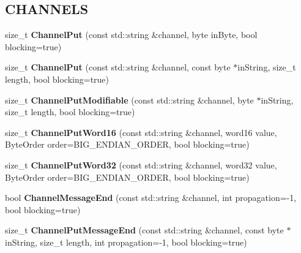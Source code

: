 \subsection*{CHANNELS}
\label{_amgrp1fdf75ac0fba97b7f66ad06fdd4493fd}
 \begin{DoxyCompactItemize}
\item 
\hypertarget{class_buffered_transformation_a97a60b54fafdb3df59e1457ef629fc5f}{
size\_\-t {\bfseries ChannelPut} (const std::string \&channel, byte inByte, bool blocking=true)}
\label{class_buffered_transformation_a97a60b54fafdb3df59e1457ef629fc5f}

\item 
\hypertarget{class_buffered_transformation_a5b7fcb31b4cb09d38242354fcbc4b45c}{
size\_\-t {\bfseries ChannelPut} (const std::string \&channel, const byte $\ast$inString, size\_\-t length, bool blocking=true)}
\label{class_buffered_transformation_a5b7fcb31b4cb09d38242354fcbc4b45c}

\item 
\hypertarget{class_buffered_transformation_a3dc27692b14108ed057beb4db67fed2f}{
size\_\-t {\bfseries ChannelPutModifiable} (const std::string \&channel, byte $\ast$inString, size\_\-t length, bool blocking=true)}
\label{class_buffered_transformation_a3dc27692b14108ed057beb4db67fed2f}

\item 
\hypertarget{class_buffered_transformation_aa1bca66c16e0e52793059b41353964bd}{
size\_\-t {\bfseries ChannelPutWord16} (const std::string \&channel, word16 value, ByteOrder order=BIG\_\-ENDIAN\_\-ORDER, bool blocking=true)}
\label{class_buffered_transformation_aa1bca66c16e0e52793059b41353964bd}

\item 
\hypertarget{class_buffered_transformation_acb06216012d6c40609db092952afcf3f}{
size\_\-t {\bfseries ChannelPutWord32} (const std::string \&channel, word32 value, ByteOrder order=BIG\_\-ENDIAN\_\-ORDER, bool blocking=true)}
\label{class_buffered_transformation_acb06216012d6c40609db092952afcf3f}

\item 
\hypertarget{class_buffered_transformation_ae0b37b299c5835083e58b205f9cc25cc}{
bool {\bfseries ChannelMessageEnd} (const std::string \&channel, int propagation=-\/1, bool blocking=true)}
\label{class_buffered_transformation_ae0b37b299c5835083e58b205f9cc25cc}

\item 
\hypertarget{class_buffered_transformation_ad3e9efe4c59093c330d287140fcfbdd9}{
size\_\-t {\bfseries ChannelPutMessageEnd} (const std::string \&channel, const byte $\ast$inString, size\_\-t length, int propagation=-\/1, bool blocking=true)}
\label{class_buffered_transformation_ad3e9efe4c59093c330d287140fcfbdd9}


\end{DoxyCompactItemize}
